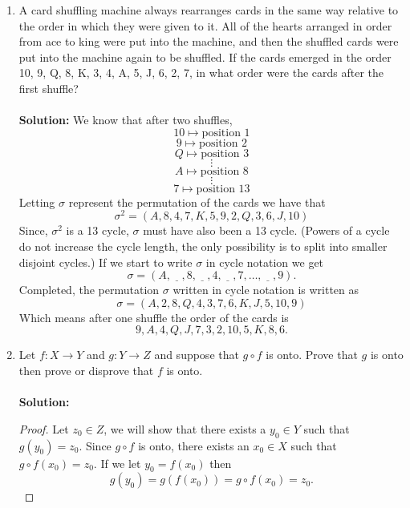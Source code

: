 \documentclass[12pt,letterpaper]{article}
\theoremstyle{plain}
\theoremstyle{definition}
\begin{document}
\begin{enumerate}[1.]
For the following proof, we will assume that $f$ and $f^{-1}$ are defined on the same domain.  
\begin{proof} Since $f(s+t)=f(s)f(t)$ for all $s$ and $t$ in the domain of $f$
\[
xy=f(f^{-1}(x))f(f^{-1}(y))=f(f^{-1}(x)+f^{-1}(y))
\]
If we apply $f^{-1}$ to both sides we get 
\[f^{-1}(xy)=f^{-1}(f(f^{-1}(x)+f^{-1}(y)))=f^{-1}(x)+f^{-1}(y)\]
\end{proof}
\item  A card shuffling machine always rearranges cards in the same way relative to the order in which they were given to it. All of the hearts arranged in order from ace to king were put into the machine, and then the shuffled cards were put into the machine again to be shuffled. If the cards emerged in the order 10, 9, Q, 8, K, 3, 4, A, 5, J, 6, 2, 7, in what order were the cards after the first shuffle?\\
\ \\
{\bf Solution:}
We know that after two shuffles, 
\[10 \mapsto \text{position }1\]\[9 \mapsto \text{position }2\]
\[Q \mapsto \text{position }3\]
\[\vdots\]
\[A \mapsto \text{position }8\]
\[\vdots \]
\[7 \mapsto \text{position }13\]
Letting $\sigma$ represent the permutation of the cards we have that 
\[\sigma^2=(A, 8 , 4, 7, K, 5, 9, 2, Q, 3, 6, J, 10)\]
Since, $\sigma^2$ is a 13 cycle, $\sigma$ must have also been a 13 cycle. (Powers of a cycle do not increase the cycle length, the only possibility is to split into smaller disjoint cycles.) 
If we start to write $\sigma$ in cycle notation we get  
\[\sigma=(A,\underline{\ \ \ \ }, 8,\underline{\ \ \ \ }, 4, \underline{\ \ \ \ }, 7, \ldots,\underline{\ \ \ \ }, 9).\]
Completed, the permutation $\sigma$ written in cycle notation is written as 
\[\sigma=(A, 2, 8, Q, 4, 3, 7, 6, K, J, 5, 10, 9)\]
Which means after one shuffle the order of the cards is \[9, A, 4, Q, J , 7, 3, 2, 10, 5, K, 8, 6.\]

\item Let $f:X\rightarrow Y$ and $g:Y\rightarrow Z$ and suppose that $g\circ f$ is onto. Prove that $g$ is onto then prove or disprove that $f$ is onto. \\
\ \\
{\bf Solution:}
\begin{proof}
Let $z_0\in Z$, we will show that there exists a $y_0\in Y$ such that $g(y_0)=z_0$. Since $g\circ f$ is onto, there exists an $x_0\in X$ such that $g\circ f(x_0)=z_0$. If we let $y_0=f(x_0)$ then \[g(y_0)=g(f(x_0))=g\circ f(x_0)=z_0.\]  

\end{proof}
\end{enumerate}
\end{document}
